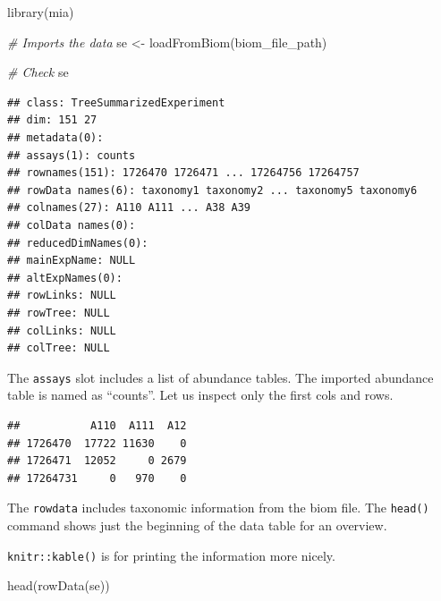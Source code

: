 \documentclass[
]{book}
\newenvironment{Shaded}{\begin{snugshade}}{\end{snugshade}}
\newcommand{\CommentTok}[1]{\textcolor[rgb]{0.56,0.35,0.01}{\textit{#1}}}
\newcommand{\DecValTok}[1]{\textcolor[rgb]{0.00,0.00,0.81}{#1}}
\newcommand{\FunctionTok}[1]{\textcolor[rgb]{0.00,0.00,0.00}{#1}}
\newcommand{\NormalTok}[1]{#1}
\newcommand{\OtherTok}[1]{\textcolor[rgb]{0.56,0.35,0.01}{#1}}
\newcommand{\SpecialCharTok}[1]{\textcolor[rgb]{0.00,0.00,0.00}{#1}}
\begin{document}
\begin{Shaded}
\begin{Highlighting}[]
\FunctionTok{library}\NormalTok{(mia)}

\CommentTok{\# Imports the data}
\NormalTok{se }\OtherTok{\textless{}{-}} \FunctionTok{loadFromBiom}\NormalTok{(biom\_file\_path)}

\CommentTok{\# Check}
\NormalTok{se}
\end{Highlighting}
\end{Shaded}

\begin{verbatim}
## class: TreeSummarizedExperiment 
## dim: 151 27 
## metadata(0):
## assays(1): counts
## rownames(151): 1726470 1726471 ... 17264756 17264757
## rowData names(6): taxonomy1 taxonomy2 ... taxonomy5 taxonomy6
## colnames(27): A110 A111 ... A38 A39
## colData names(0):
## reducedDimNames(0):
## mainExpName: NULL
## altExpNames(0):
## rowLinks: NULL
## rowTree: NULL
## colLinks: NULL
## colTree: NULL
\end{verbatim}

The \texttt{assays} slot includes a list of abundance tables. The imported
abundance table is named as ``counts''. Let us inspect only the first
cols and rows.

\begin{Shaded}
\end{Shaded}

\begin{verbatim}
##           A110  A111  A12
## 1726470  17722 11630    0
## 1726471  12052     0 2679
## 17264731     0   970    0
\end{verbatim}

The \texttt{rowdata} includes taxonomic information from the biom file. The \texttt{head()} command
shows just the beginning of the data table for an overview.

\texttt{knitr::kable()} is for printing the information more nicely.

\begin{Shaded}
\begin{Highlighting}[]
\FunctionTok{head}\NormalTok{(}\FunctionTok{rowData}\NormalTok{(se))}
\end{Highlighting}
\end{Shaded}
\end{document}
